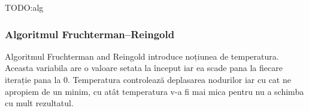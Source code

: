 TODO:alg

\subsubsection{Algoritmul Fruchterman–Reingold}

Algoritmul Fruchterman and Reingold introduce noțiunea de temperatura. Aceasta variabila are o valoare setata 
la început iar ea scade pana la fiecare iterație pana la 0. Temperatura controlează deplasarea nodurilor iar cu 
cat ne apropiem de un minim, cu atât temperatura v-a fi mai mica pentru nu a schimba cu mult rezultatul.


